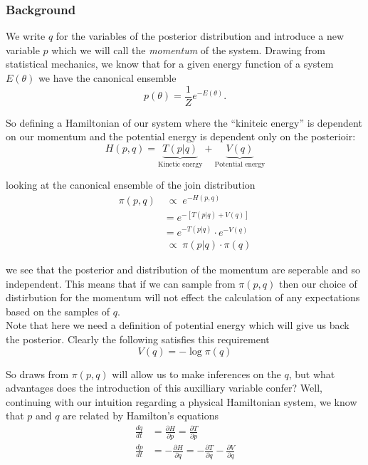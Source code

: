 \documentclass{article}
\begin{document}
\subsubsection{Background}

We write $q$ for the variables of the posterior distribution and introduce a new variable $p$ which we will call the \emph{momentum} of the system. Drawing from statistical mechanics, we know that for a given energy function of a system $E(\theta)$ we have the canonical ensemble
\begin{equation}
  p(\theta) = \frac{1}{Z} e^{-E(\theta)}.
\end{equation}

So defining a Hamiltonian of our system where the ``kiniteic energy'' is dependent on our momentum and the potential energy is dependent only on the posterioir:
\begin{equation}
  H(p, q) = \underbrace{T(p|q)}_{\text{Kinetic energy}} + \underbrace{V(q)}_{\text{Potential energy}}
\end{equation} 

looking at the canonical ensemble of the join distribution
\begin{align}
  \pi(p, q) &\;{\propto} \; e^{-H(p, q)} \\
          &= e^{-[T(p|q) + V(q)]} \\
          &= e^{-T(p|q)} \cdot e^{-V(q)} \\
          &\;{\propto} \; \pi(p|q) \cdot \pi(q) 
\end{align}

we see that the posterior and distribution of the momentum are seperable and so independent. This means that if we can sample from $\pi(p, q)$ then our choice of distirbution for the momentum will not effect the calculation of any expectations based on the samples of $q$. \\

Note that here we need a definition of potential energy which will give us back the posterior. Clearly the following satisfies this requirement
\begin{equation}
  V(q) = - \log \pi(q)
\end{equation}

So draws from $\pi(p, q)$ will allow us to make inferences on the $q$, but what advantages does the introduction of this auxilliary variable confer? Well, continuing with our intuition regarding a physical Hamiltonian system, we know that $p$ and $q$ are related by Hamilton's equations
\begin{align}
\frac{dq}{dt} &= \frac{\partial H}{\partial p} = \frac{\partial T}{\partial p} \\
\frac{dp}{dt} &= - \frac{\partial H}{\partial q} = - \frac{\partial T}{\partial q} - \frac{\partial V}{\partial q}
\end{align}
\end{document}

